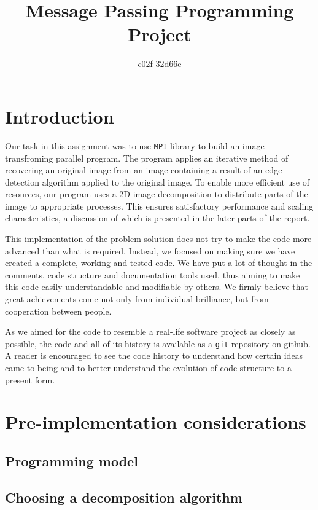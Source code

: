 \documentclass[11pt,a4paper]{article}
\begin{document}
\title{Message Passing Programming Project}
\author{c02f-32d66e}
\maketitle

\section{Introduction}
Our task in this assignment was to use \texttt{MPI} library to build an image-transfroming parallel program.
The program applies an iterative method of recovering an original image from an image containing a result of an edge detection algorithm applied to the original image. 
To enable more efficient use of resources, our program uses a 2D image decomposition to distribute parts of the image to appropriate processes. 
This ensures satisfactory performance and scaling characteristics, a discussion of which is presented in the later parts of the report.

This implementation of the problem solution does not try to make the code more advanced than what is required. 
Instead, we focused on making sure we have created a complete, working and tested code. 
We have put a lot of thought in the comments, code structure and documentation tools used, thus aiming to make this code easily understandable and modifiable by others. We firmly believe that great achievements come not only from individual brilliance, but from cooperation between people.

As we aimed for the code to resemble a real-life software project as closely as possible, the code and all of its history is available as a \texttt{git} repository on \href{https://github.com/mkawalec/5thyear/tree/master/mpp/MPP-casestudy}{github}. A reader is encouraged to see the code history to understand how certain ideas came to being and to better understand the evolution of code structure to a present form.

\section{Pre-implementation considerations}
\subsection{Programming model}
\subsection{Choosing a decomposition algorithm}
\end{document}
